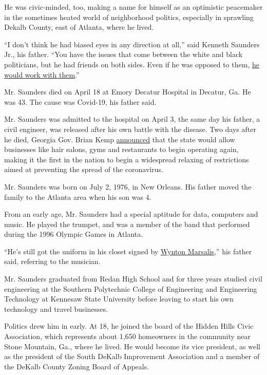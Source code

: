 He was civic-minded, too, making a name for himself as an optimistic
peacemaker in the sometimes heated world of neighborhood politics,
especially in sprawling Dekalb County, east of Atlanta, where he lived.

``I don't think he had biased eyes in any direction at all,'' said
Kenneth Saunders Jr., his father. ``You have the issues that come
between the white and black politicians, but he had friends on both
sides. Even if he was opposed to them,
\href{https://decaturish.com/2020/04/zba-and-south-dekalb-improvement-association-member-kenneth-saunders-iii-dies-from-covid-19/}{he
would work with them}.''

Mr. Saunders died on April 18 at Emory Decatur Hospital in Decatur, Ga.
He was 43. The cause was Covid-19, his father said.

Mr. Saunders was admitted to the hospital on April 3, the same day his
father, a civil engineer, was released after his own battle with the
disease. Two days after he died, Georgia Gov. Brian Kemp
\href{https://www.nytimes.com/2020/04/21/us/coronavirus-georgia-south-carolina.html}{announced}
that the state would allow businesses like hair salons, gyms and
restaurants to begin operating again, making it the first in the nation
to begin a widespread relaxing of restrictions aimed at preventing the
spread of the coronavirus.

Mr. Saunders was born on July 2, 1976, in New Orleans. His father moved
the family to the Atlanta area when his son was 4.

From an early age, Mr. Saunders had a special aptitude for data,
computers and music. He played the trumpet, and was a member of the band
that performed during the 1996 Olympic Games in Atlanta.

``He's still got the uniform in his closet signed by
\href{https://wyntonmarsalis.org/about/bio}{Wynton Marsalis},'' his
father said, referring to the musician.

Mr. Saunders graduated from Redan High School and for three years
studied civil engineering at the Southern Polytechnic College of
Engineering and Engineering Technology at Kennesaw State University
before leaving to start his own technology and travel businesses.

Politics drew him in early. At 18, he joined the board of the Hidden
Hills Civic Association, which represents about 1,650 homeowners in the
community near Stone Mountain, Ga., where he lived. He would become its
vice president, as well as the president of the South DeKalb Improvement
Association and a member of the DeKalb County Zoning Board of Appeals.

